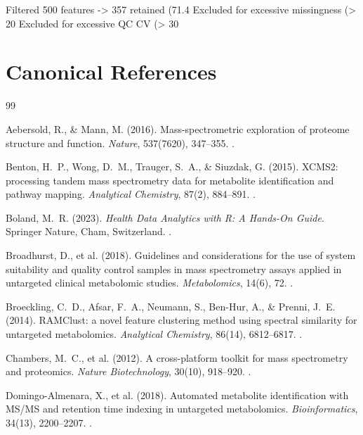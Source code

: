 \documentclass[11pt,twoside,openright]{book}
\begin{document}
\begin{routput} Filtered 500 features -> 357 retained (71.4%
Excluded for excessive missingness (> 20%
Excluded for excessive QC CV (> 30%
\end{routput}

\section*{Canonical References}

\begin{thebibliography}{99}

Aebersold, R., \& Mann, M. (2016). Mass-spectrometric exploration of proteome structure and function. \textit{Nature}, 537(7620), 347--355. .

Benton, H.~P., Wong, D.~M., Trauger, S.~A., \& Siuzdak, G. (2015). XCMS2: processing tandem mass spectrometry data for metabolite identification and pathway mapping. \textit{Analytical Chemistry}, 87(2), 884--891. .

Boland, M.~R. (2023). \textit{Health Data Analytics with R: A Hands-On Guide}. Springer Nature, Cham, Switzerland. .

Broadhurst, D., et al. (2018). Guidelines and considerations for the use of system suitability and quality control samples in mass spectrometry assays applied in untargeted clinical metabolomic studies. \textit{Metabolomics}, 14(6), 72. .

Broeckling, C.~D., Afsar, F.~A., Neumann, S., Ben-Hur, A., \& Prenni, J.~E. (2014). RAMClust: a novel feature clustering method using spectral similarity for untargeted metabolomics. \textit{Analytical Chemistry}, 86(14), 6812--6817. .

Chambers, M.~C., et al. (2012). A cross-platform toolkit for mass spectrometry and proteomics. \textit{Nature Biotechnology}, 30(10), 918--920. .

Domingo-Almenara, X., et al. (2018). Automated metabolite identification with MS/MS and retention time indexing in untargeted metabolomics. \textit{Bioinformatics}, 34(13), 2200--2207. .


\end{thebibliography}
\end{document}
